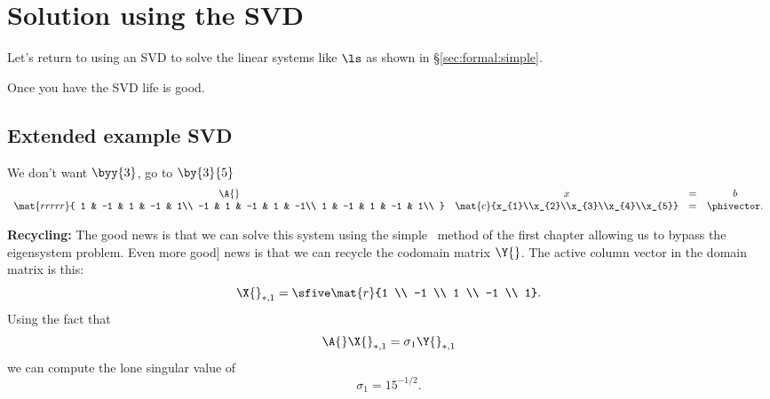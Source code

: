 \section{Solution using the SVD}
Let's return to using an SVD to solve the linear systems like $\ls$ as shown in \S\eqref{sec:formal:simple}.

Once you have the SVD life is good.
 
\subsection{Extended example SVD}
We don't want $\byy{3}$, go to $\by{3}{5}$
\begin{equation}
  \begin{array}{cccc}
    \A{}&x &=& b\\
    \mat{rrrrr}
    {
     1 & -1 &  1 & -1 &  1\\
    -1 &  1 & -1 &  1 & -1\\
     1 & -1 &  1 & -1 &  1\\
    }
    &
    \mat{c}{x_{1}\\x_{2}\\x_{3}\\x_{4}\\x_{5}}
    &=& \phivector.
  \end{array}
\end{equation}

\textbf{Recycling:} The good news is that we can solve this system using the simple \svdl \ method of the first chapter allowing us to bypass the eigensystem problem. Even more good] news is that we can recycle the codomain matrix $\Y{}$. The active column vector in the domain matrix is this:
\begin{equation}
  \X{}_{*,1} = \sfive\mat{r}{1 \\ -1 \\  1 \\ -1 \\  1}.
\end{equation}
Using the fact that
\begin{equation}
  \begin{split}
    \A{}\X{}_{*,1}=\sigma_{1}\Y{}_{*,1}
  \end{split}
\end{equation}
we can compute the lone singular value of
\begin{equation}
  \sigma_{1} = 15^{-1/2}.
\end{equation}

